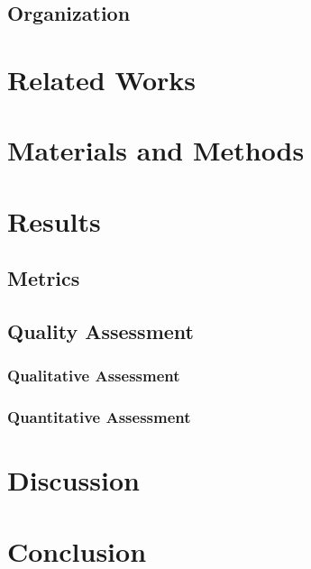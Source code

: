 \documentclass{article}
\begin{document}
	\subsection{Organization}
	
	\section{Related Works}
	
	\section{Materials and Methods}
	
	\section{Results}
	\subsection{Metrics}
	\subsection{Quality Assessment}
	\subsubsection{Qualitative Assessment}
	\subsubsection{Quantitative Assessment}
	
	\section{Discussion}
	
	\section{Conclusion}
	
	\newpage
	
	
\end{document}
